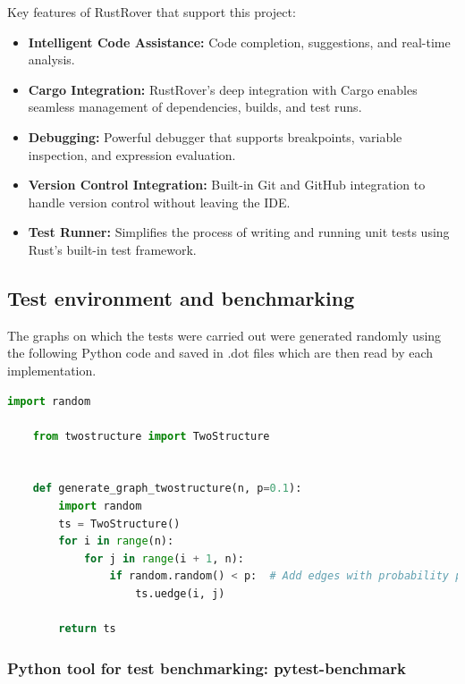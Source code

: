 Key features of RustRover that support this project:
\begin{itemize}
    \item \textbf{Intelligent Code Assistance:} Code completion, suggestions, and real-time analysis.
    \item \textbf{Cargo Integration:} RustRover's deep integration with Cargo enables seamless management of dependencies, builds, and test runs.
    \item \textbf{Debugging:} Powerful debugger that supports breakpoints, variable inspection, and expression evaluation.
    \item \textbf{Version Control Integration:} Built-in Git and GitHub integration to handle version control without leaving the IDE\@.
    \item \textbf{Test Runner:} Simplifies the process of writing and running unit tests using Rust’s built-in test framework.
\end{itemize}

\subsection{Test environment and benchmarking}\label{subsec:test-environment-and-benchmarking}

The graphs on which the tests were carried out were generated randomly using the following Python code and saved in .dot files which are then read by each implementation.

\begin{lstlisting}[language=Python, style=python, caption={Graph generation code}, label={lst:graph-generation-code}, firstnumber=1]
    import random

    from twostructure import TwoStructure


    def generate_graph_twostructure(n, p=0.1):
        import random
        ts = TwoStructure()
        for i in range(n):
            for j in range(i + 1, n):
                if random.random() < p:  # Add edges with probability p
                    ts.uedge(i, j)

        return ts
\end{lstlisting}


\subsubsection{Python tool for test benchmarking: pytest-benchmark}

